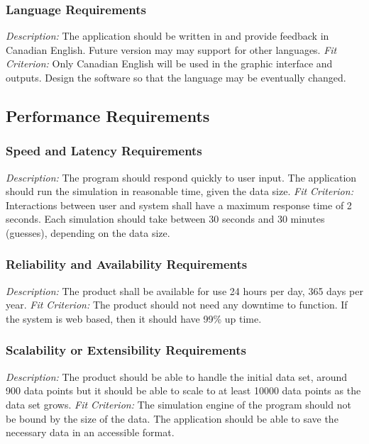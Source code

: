 \documentclass[12pt, titlepage]{article}
\begin{document}
\subsubsection{Language Requirements}
\textit{Description:}\newline
The application should be written in and provide feedback in Canadian English. Future version may may support for other languages.
\newline \newline 
\textit{Fit Criterion:}\newline 
Only Canadian English will be used in the graphic interface and outputs.
Design the software so that the language may be eventually changed.

\subsection{Performance Requirements}
\subsubsection{Speed and Latency Requirements}
\textit{Description:}\newline
The program should respond quickly to user input. The application should run the simulation in reasonable time, given the data size.
\newline \newline 
\textit{Fit Criterion:}\newline 
Interactions between user and system shall have a maximum response time of 2 seconds. Each simulation should take between 30 seconds and 30 minutes (guesses), depending on the data size.

\subsubsection{Reliability and Availability Requirements}
\textit{Description:}\newline
The product shall be available for use 24 hours per day, 365 days per year.
\newline \newline 
\textit{Fit Criterion:}\newline 
The product should not need any downtime to function. If the system is web based, then it should have 99\% up time.

\subsubsection{Scalability or Extensibility Requirements}
\textit{Description:}\newline
The product should be able to handle the initial data set, around 900 data points but it should be able to scale to at least 10000 data points as the data set grows.
\newline \newline 
\textit{Fit Criterion:}\newline 
The simulation engine of the program should not be bound by the size of the data. The application should be able to save the necessary data in an accessible format.
\end{document}
